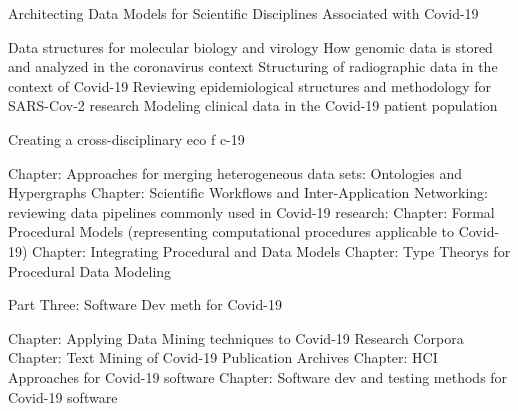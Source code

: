 \documentclass{statsoc}
\begin{document}
Architecting Data Models for Scientific Disciplines Associated with Covid-19

Data structures for molecular biology and virology
How genomic data is stored and analyzed in the coronavirus context
Structuring of radiographic data in the context of Covid-19
Reviewing epidemiological structures and methodology for SARS-Cov-2 research
Modeling clinical data in the Covid-19 patient population  
 

Creating a cross-disciplinary eco f c-19

Chapter:  Approaches for merging heterogeneous data sets: Ontologies and Hypergraphs
Chapter:  Scientific Workflows and Inter-Application Networking: reviewing data pipelines commonly used in Covid-19 research: 
Chapter:  Formal Procedural Models (representing computational procedures applicable to Covid-19)
Chapter:  Integrating Procedural and Data Models
Chapter:  Type Theorys for Procedural Data Modeling


Part Three:  Software Dev meth for Covid-19 

Chapter:  Applying Data Mining techniques to Covid-19 Research Corpora
Chapter:  Text Mining of Covid-19 Publication Archives
Chapter:  HCI Approaches for Covid-19 software 
Chapter:  Software dev and testing methods for Covid-19 software 
\end{document}
